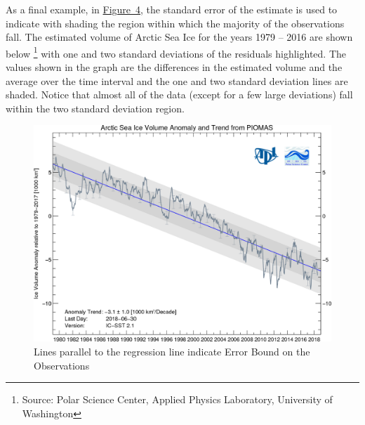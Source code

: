 \documentclass[10pt,]{book}
\theoremstyle{ptxdefinitionnotitle}
\theoremstyle{ptxdefinitiontitle}
\numberwithin{equation}{section}
\begin{document}
\hypertarget{p-136}{}%
As a final example, in \hyperref[artic-sea-ice]{Figure~4}, the standard error of the estimate is used to indicate with shading the region within which the majority of the observations fall. The estimated volume of Arctic Sea Ice for the years 1979 – 2016 are shown below \footnote{Source: Polar Science Center, Applied Physics Laboratory, University of Washington\label{fn-1}} with one and two standard deviations of the residuals highlighted. The values shown in the graph are the differences in the estimated volume and the average over the time interval and the one and two standard deviation lines are shaded. Notice that almost all of the data (except for a few large deviations) fall within the two standard deviation region.%
\begin{figure}
\centering
\includegraphics[width=1\linewidth]{src/images/chapter01/artic-sea-ice-volume.png}
\caption{Lines parallel to the regression line indicate Error Bound on the Observations\label{artic-sea-ice}}
\end{figure}
\typeout{************************************************}
\typeout{************************************************}
\end{document}
